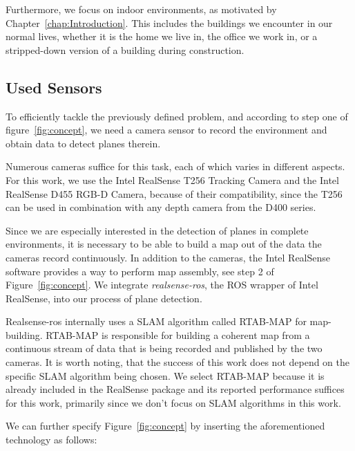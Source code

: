 \documentclass[main.tex]{subfiles}
\begin{document}
Furthermore, we focus on indoor environments, as motivated by Chapter~\ref{chap:Introduction}.
This includes the buildings we encounter in our normal lives, whether it is the home we live in, the office we work in, or a stripped-down version of a building during construction.




\subsection{Used Sensors}
To efficiently tackle the previously defined problem, and according to step one of figure~\ref{fig:concept}, we need a camera sensor to record the environment and obtain data to detect planes therein.

Numerous cameras suffice for this task, each of which varies in different aspects.
For this work, we use the Intel RealSense T256 Tracking Camera and the Intel RealSense D455 RGB-D Camera, because of their compatibility,
since the T256 can be used in combination with any depth camera from the D400 series.

Since we are especially interested in the detection of planes in complete environments, it is necessary to be able to build a map out of the data the cameras
record continuously.
In addition to the cameras, the Intel RealSense software provides a way to perform map assembly, see step 2 of Figure~\ref{fig:concept}.%
We integrate \textit{realsense-ros}, the ROS wrapper of Intel RealSense, into our process of plane detection.

Realsense-ros internally uses a SLAM algorithm called RTAB-MAP \cite{Labbé_Michaud_2019} for map-building.
RTAB-MAP is responsible for building a coherent map from a continuous stream of data that is being recorded and published by the two cameras.
It is worth noting, that the success of this work does not depend on the specific SLAM algorithm being chosen. We select RTAB-MAP because
it is already included in the RealSense package and its reported performance suffices for this work, primarily since we don't focus on SLAM
algorithms in this work.

We can further specify Figure~\ref{fig:concept} by inserting the aforementioned technology as follows:
\end{document}
